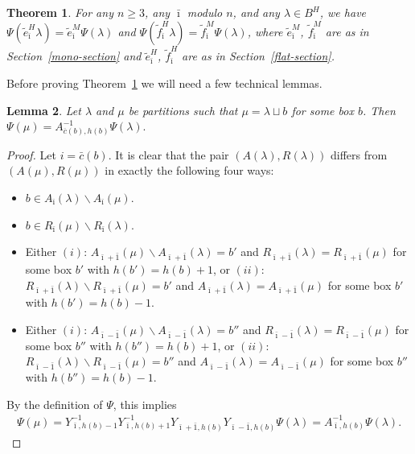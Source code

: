 \documentclass[11pt]{article}
\newtheorem{Theorem}{Theorem}[section]
\newtheorem{Lemma}[Theorem]{Lemma}
\theoremstyle{definition}
\begin{document}
\begin{Theorem} \label{iso-th}
For any $n \geq 3$, any $\bar \imath$ modulo $n$, and any $\lambda \in B^H$, we have $\Psi(\tilde e_{\bar \imath}^H \lambda) = \tilde e_{\bar \imath}^M \Psi(\lambda)$ and $\Psi(\tilde f_{\bar \imath}^H \lambda) = \tilde f_{\bar \imath}^M \Psi(\lambda)$, where $\tilde e_{\bar \imath}^M$, $\tilde f_{\bar \imath}^M$ are as in Section~{\rm \ref{mono-section}} and $\tilde e_{\bar \imath}^H$, $\tilde f_{\bar \imath}^H$ are as in Section~{\rm \ref{flat-section}}.
\end{Theorem}

Before proving Theorem~\ref{iso-th} we will need a few technical lemmas.

\begin{Lemma} \label{bv}
Let $\lambda$ and $\mu$ be partitions such that $\mu = \lambda \sqcup b$ for some box $b$. Then $\Psi(\mu) = A_{\overline c(b), h(b)}^{-1} \Psi(\lambda).$
\end{Lemma}

\begin{proof} Let $i= \bar c(b)$.
It is clear that the pair $( A(\lambda), R(\lambda))$ dif\/fers from  $( A(\mu), R(\mu))$ in exactly the following four ways:
\begin{itemize}\itemsep=0pt
\item $b \in A_{\bar \imath}(\lambda) \backslash A_{\bar \imath}(\mu)$.

\item   $b \in R_{\bar \imath}(\mu) \backslash R_{\bar \imath}(\lambda)$.


\item Either $(i)$: $A_{\bar \imath + \bar 1}(\mu) \backslash A_{\bar \imath + \bar 1}(\lambda)= b'$ and $ R_{\bar \imath + \bar 1}(\lambda) =R_{\bar \imath + \bar 1}(\mu)$ for some box $b'$ with $h(b') = h(b)+1$, or $(ii)$: $R_{\bar \imath + \bar 1}(\lambda) \backslash R_{\bar \imath + \bar 1}(\mu) = b'$ and $ A_{\bar \imath + \bar 1}(\lambda) =A_{\bar \imath + \bar 1}(\mu)$ for some box $b'$ with $h(b')= h(b)-1$.

\item Either $(i)$: $A_{\bar \imath - \bar 1}(\mu) \backslash A_{\bar \imath - \bar 1}(\lambda)= b''$ and $ R_{\bar \imath - \bar 1}(\lambda) =R_{\bar \imath - \bar 1}(\mu)$ for some box $b''$ with $h(b'') = h(b)+1$, or $(ii)$: $R_{\bar \imath - \bar 1}(\lambda) \backslash R_{\bar \imath - \bar 1}(\mu) = b''$ and $ A_{\bar \imath - \bar 1}(\lambda) =A_{\bar \imath - \bar 1}(\mu)$ for some box $b''$ with $h(b'')= h(b)-1$.
\end{itemize}
By the def\/inition of $\Psi$, this implies
\begin{gather*}
\Psi(\mu)= Y_{\bar \imath, h(b)-1}^{-1}  Y_{\bar \imath, h(b)+1}^{-1}  Y_{\bar \imath+\bar 1, h(b)}^{}  Y_{\bar \imath-\bar 1, h(b)}^{}  \Psi(\lambda) = A_{\bar \imath, h(b)}^{-1} \Psi(\lambda).\tag*{\qed}
\end{gather*}\renewcommand{\qed}{}
\end{proof}
\end{document}
